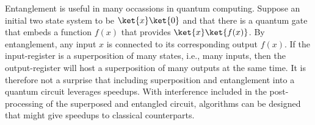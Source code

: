 \documentclass[../main.tex]{subfiles}
\begin{document}
Entanglement is useful in many occassions in quantum computing. Suppose an initial two state system to be $\ket{x}\ket{0}$ and that there is a quantum gate that embeds a function $f(x)$ that provides $\ket{x}\ket{f(x)}$. By entanglement, any input $x$ is connected to its corresponding output $f(x)$. If the input-register is a superposition of many states, i.e., many inputs, then the output-register will host a superposition of many outputs at the same time. It is therefore not a surprise that including superposition and entanglement into a quantum circuit leverages speedups. With interference included in the post-processing of the superposed and entangled circuit, algorithms can be designed that might give speedups to classical counterparts.


\biblio
\end{document}
